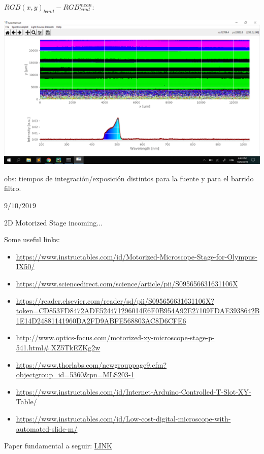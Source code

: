\documentclass[12pt,dvipsnames]{exam}
\begin{document}
\newpage
$RGB(x,y)_{band} - RGB^{mean}_{band}$:
\begin{center}
	\includegraphics[scale=0.2]{imgs/gui/gui1.png}
\end{center}

obs: tiempos de integración/exposición distintos para la fuente y para el barrido filtro.



\hrulefill

$9/10/2019$

2D Motorized Stage incoming...


Some useful links:

\begin{itemize}
	\item \url{https://www.instructables.com/id/Motorized-Microscope-Stage-for-Olympus-IX50/}
	\item \url{https://www.sciencedirect.com/science/article/pii/S095656631631106X}
		\item \url{https://reader.elsevier.com/reader/sd/pii/S095656631631106X?token=CD853FD8472ADE524471296014E6F0B954A92E27109FDAE3938642B1E14D24881141960DA2FD9ABFE568803AC8D6CFE6}
\item \url{http://www.optics-focus.com/motorized-xy-microscope-stage-p-541.html#.XZ5TkEZKg2w}
	\item \url{https://www.thorlabs.com/newgrouppage9.cfm?objectgroup_id=5360&pn=MLS203-1}	
	\item \url{https://www.instructables.com/id/Internet-Arduino-Controlled-T-Slot-XY-Table/}
	\item \url{https://www.instructables.com/id/Low-cost-digital-microscope-with-automated-slide-m/}
\end{itemize}


Paper fundamental a seguir:
\href{https://reader.elsevier.com/reader/sd/pii/S095656631631106X?token=D9588CB30F54FB09F8EA5C89EB096F16036AD47E209DD10BCB3138EE9C6500AE62D6D0902D2BB257A30B763BE6C51B37}{LINK}
\end{document}
